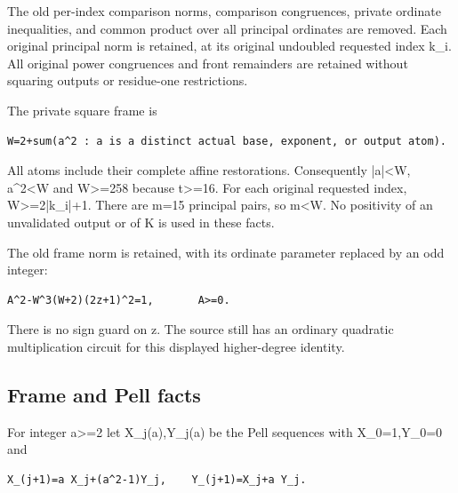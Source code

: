 The old per-index comparison norms, comparison congruences, private ordinate inequalities, and common product over all principal ordinates are removed. Each original principal norm is retained, at its original undoubled requested index k\_\allowbreak{}i. All original power congruences and front remainders are retained without squaring outputs or residue-one restrictions.



The private square frame is



\begin{verbatim}
W=2+sum(a^2 : a is a distinct actual base, exponent, or output atom).
\end{verbatim}

All atoms include their complete affine restorations. Consequently |a|\textless{}\allowbreak{}W, a\textasciicircum{}\allowbreak{}2\textless{}\allowbreak{}W and W\textgreater{}\allowbreak{}=\allowbreak{}258 because t\textgreater{}\allowbreak{}=\allowbreak{}16. For each original requested index, W\textgreater{}\allowbreak{}=\allowbreak{}2|k\_\allowbreak{}i|+\allowbreak{}1. There are m=\allowbreak{}15 principal pairs, so m\textless{}\allowbreak{}W. No positivity of an unvalidated output or of K is used in these facts.



The old frame norm is retained, with its ordinate parameter replaced by an odd integer:



\begin{verbatim}
A^2-W^3(W+2)(2z+1)^2=1,       A>=0.
\end{verbatim}

There is no sign guard on z. The source still has an ordinary quadratic multiplication circuit for this displayed higher-degree identity.



\subsection{Frame and Pell facts}



For integer a\textgreater{}\allowbreak{}=\allowbreak{}2 let X\_\allowbreak{}j(a),Y\_\allowbreak{}j(a) be the Pell sequences with X\_\allowbreak{}0=\allowbreak{}1,Y\_\allowbreak{}0=\allowbreak{}0 and



\begin{verbatim}
X_(j+1)=a X_j+(a^2-1)Y_j,    Y_(j+1)=X_j+a Y_j.
\end{verbatim}

